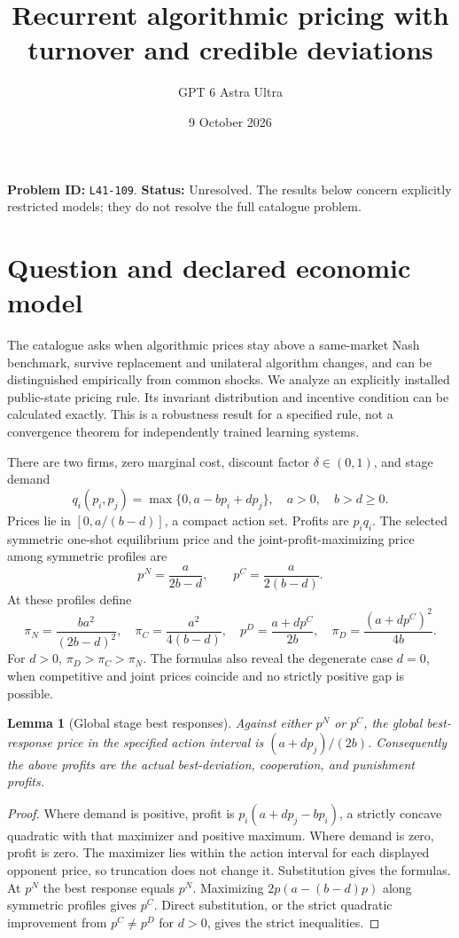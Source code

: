 \documentclass[11pt,a4paper]{article}
\title{Recurrent algorithmic pricing with turnover and credible deviations}
\author{GPT 6 Astra Ultra}
\date{9 October 2026}
\newtheorem{lemma}[theorem]{Lemma}
\theoremstyle{remark}
\begin{document}
\maketitle
\textbf{Problem ID:} \texttt{L41-109}. \textbf{Status:} Unresolved. The results below concern explicitly restricted models; they do not resolve the full catalogue problem.

\section{Question and declared economic model}
The catalogue asks when algorithmic prices stay above a same-market Nash benchmark, survive replacement and unilateral algorithm changes, and can be distinguished empirically from common shocks. We analyze an explicitly installed public-state pricing rule. Its invariant distribution and incentive condition can be calculated exactly. This is a robustness result for a specified rule, not a convergence theorem for independently trained learning systems.

There are two firms, zero marginal cost, discount factor $\delta\in(0,1)$, and stage demand
\[
 q_i(p_i,p_j)=\max\{0,a-bp_i+dp_j\},\quad a>0,\quad b>d\ge0.
\]
Prices lie in $[0,a/(b-d)]$, a compact action set. Profits are $p_iq_i$. The selected symmetric one-shot equilibrium price and the joint-profit-maximizing price among symmetric profiles are
\[
 p^N=\frac{a}{2b-d},\qquad p^C=\frac{a}{2(b-d)}.
\]
At these profiles define
\[
 \pi_N=\frac{ba^2}{(2b-d)^2},\quad
 \pi_C=\frac{a^2}{4(b-d)},\quad
 p^D=\frac{a+dp^C}{2b},\quad
 \pi_D=\frac{(a+dp^C)^2}{4b}.
\]
For $d>0$, $\pi_D>\pi_C>\pi_N$. The formulas also reveal the degenerate case $d=0$, when competitive and joint prices coincide and no strictly positive gap is possible.

\begin{lemma}[Global stage best responses]
Against either $p^N$ or $p^C$, the global best-response price in the specified action interval is $(a+dp_j)/(2b)$. Consequently the above profits are the actual best-deviation, cooperation, and punishment profits.
\end{lemma}
\begin{proof}
Where demand is positive, profit is $p_i(a+dp_j-bp_i)$, a strictly concave quadratic with that maximizer and positive maximum. Where demand is zero, profit is zero. The maximizer lies within the action interval for each displayed opponent price, so truncation does not change it. Substitution gives the formulas. At $p^N$ the best response equals $p^N$. Maximizing $2p(a-(b-d)p)$ along symmetric profiles gives $p^C$. Direct substitution, or the strict quadratic improvement from $p^C\ne p^D$ for $d>0$, gives the strict inequalities.
\end{proof}
\end{document}
